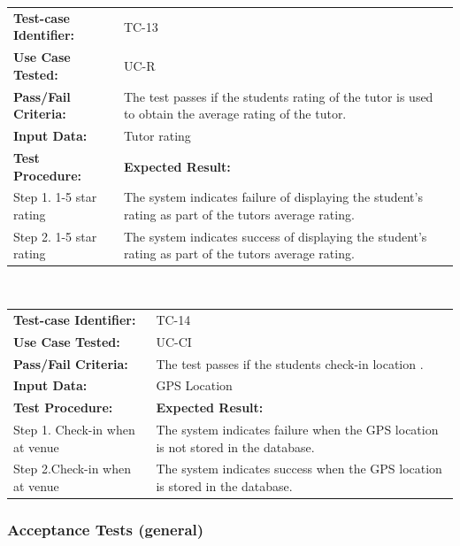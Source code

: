 \documentclass[12pt]{article}
\begin{document}
\begin{tabular}{| p{8cm} | p{8cm} |} \hline
	\textbf{Test-case Identifier:}& TC-13\\
	\textbf{Use Case Tested:}& UC-R\\
	\textbf{Pass/Fail Criteria:}& The test passes if the students rating of the tutor is used to obtain the average rating of the tutor.\\
	\textbf{Input Data:}& Tutor rating\\\hline
	\textbf{Test Procedure:}& \textbf{Expected Result:} \\\hline
	Step 1. 1-5 star rating & The system indicates failure of displaying the student's rating as part of the tutors average rating. \\
	Step 2. 1-5 star rating & The system indicates success of displaying the student's rating as part of the tutors average rating.\\
		\hline
\end{tabular}
\\

\begin{tabular}{| p{8cm} | p{8cm} |} \hline
	\textbf{Test-case Identifier:}& TC-14\\
	\textbf{Use Case Tested:}& UC-CI\\
	\textbf{Pass/Fail Criteria:}& The test passes if the students check-in location .\\
	\textbf{Input Data:}& GPS Location\\\hline
	\textbf{Test Procedure:}& \textbf{Expected Result:} \\\hline
	Step 1. Check-in when at venue & The system indicates failure when the GPS location is not stored in the database. \\
	Step 2.Check-in when at venue & The system indicates success when the GPS location is  stored in the database.\\
		\hline
\end{tabular}
\subsubsection{Acceptance Tests (general)}
\end{document}
